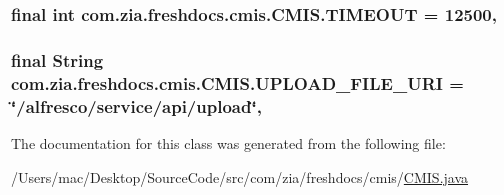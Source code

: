 \hypertarget{classcom_1_1zia_1_1freshdocs_1_1cmis_1_1_c_m_i_s_af72dbee69e05863262c0f59b122c5498}{
\subsubsection[{T\-I\-M\-E\-O\-U\-T}]{\setlength{\rightskip}{0pt plus 5cm}final int com.\-zia.\-freshdocs.\-cmis.\-C\-M\-I\-S.\-T\-I\-M\-E\-O\-U\-T = 12500\hspace{0.3cm}{\ttfamily [static]}, {\ttfamily [protected]}}}\label{classcom_1_1zia_1_1freshdocs_1_1cmis_1_1_c_m_i_s_af72dbee69e05863262c0f59b122c5498}
\hypertarget{classcom_1_1zia_1_1freshdocs_1_1cmis_1_1_c_m_i_s_a5c35a22041c7526f1e3aa2e77870a725}{
\subsubsection[{U\-P\-L\-O\-A\-D\-\_\-\-F\-I\-L\-E\-\_\-\-U\-R\-I}]{\setlength{\rightskip}{0pt plus 5cm}final String com.\-zia.\-freshdocs.\-cmis.\-C\-M\-I\-S.\-U\-P\-L\-O\-A\-D\-\_\-\-F\-I\-L\-E\-\_\-\-U\-R\-I = \char`\"{}/alfresco/service/api/{\bf upload}\char`\"{}\hspace{0.3cm}{\ttfamily [static]}, {\ttfamily [protected]}}}\label{classcom_1_1zia_1_1freshdocs_1_1cmis_1_1_c_m_i_s_a5c35a22041c7526f1e3aa2e77870a725}


The documentation for this class was generated from the following file\-:\begin{DoxyCompactItemize}
\item 
/\-Users/mac/\-Desktop/\-Source\-Code/src/com/zia/freshdocs/cmis/\hyperlink{_c_m_i_s_8java}{C\-M\-I\-S.\-java}\end{DoxyCompactItemize}
